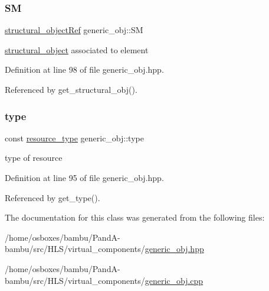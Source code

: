 \subsubsection{\texorpdfstring{SM}{SM}}
{\footnotesize\ttfamily \hyperlink{structural__objects_8hpp_a8ea5f8cc50ab8f4c31e2751074ff60b2}{structural\+\_\+object\+Ref} generic\+\_\+obj\+::\+SM\hspace{0.3cm}{\ttfamily [protected]}}



\hyperlink{classstructural__object}{structural\+\_\+object} associated to element 



Definition at line 98 of file generic\+\_\+obj.\+hpp.



Referenced by get\+\_\+structural\+\_\+obj().

\mbox{\label{classgeneric__obj_aa9a48db33724bb3d62af38fabcf5f093}} 
\subsubsection{\texorpdfstring{type}{type}}
{\footnotesize\ttfamily const \hyperlink{classgeneric__obj_a340b4a97256b423ea4a86bfdf201ec65}{resource\+\_\+type} generic\+\_\+obj\+::type\hspace{0.3cm}{\ttfamily [protected]}}



type of resource 



Definition at line 95 of file generic\+\_\+obj.\+hpp.



Referenced by get\+\_\+type().



The documentation for this class was generated from the following files\+:\begin{DoxyCompactItemize}
\item 
/home/osboxes/bambu/\+Pand\+A-\/bambu/src/\+H\+L\+S/virtual\+\_\+components/\hyperlink{generic__obj_8hpp}{generic\+\_\+obj.\+hpp}\item 
/home/osboxes/bambu/\+Pand\+A-\/bambu/src/\+H\+L\+S/virtual\+\_\+components/\hyperlink{generic__obj_8cpp}{generic\+\_\+obj.\+cpp}\end{DoxyCompactItemize}
